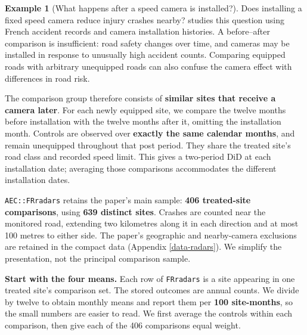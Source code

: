 \documentclass[
  11pt,
]{book}
\theoremstyle{definition}
\theoremstyle{definition}
\newtheorem{example}{Example}[chapter]
\theoremstyle{definition}
\theoremstyle{definition}
\theoremstyle{remark}
\begin{document}
\begin{example}[What happens after a speed camera is installed?]
\protect\hypertarget{exm:panel-did-radars}{}\label{exm:panel-did-radars}Does installing a fixed speed camera reduce injury crashes nearby? \citet{Renne_2026_cameras} studies this question using French accident records and camera installation histories. A before--after comparison is insufficient: road safety changes over time, and cameras may be installed in response to unusually high accident counts. Comparing equipped roads with arbitrary unequipped roads can also confuse the camera effect with differences in road risk.

The comparison group therefore consists of \textbf{similar sites that receive a camera later}. For each newly equipped site, we compare the twelve months before installation with the twelve months after it, omitting the installation month. Controls are observed over \textbf{exactly the same calendar months}, and remain unequipped throughout that post period. They share the treated site's road class and recorded speed limit. This gives a two-period DiD at each installation date; averaging those comparisons accommodates the different installation dates.

\texttt{AEC::FRradars} retains the paper's main sample: \textbf{406 treated-site comparisons}, using \textbf{639 distinct sites}. Crashes are counted near the monitored road, extending two kilometres along it in each direction and at most 100 metres to either side. The paper's geographic and nearby-camera exclusions are retained in the compact data (Appendix \ref{data-radars}). We simplify the presentation, not the principal comparison sample.

\textbf{Start with the four means.} Each row of \texttt{FRradars} is a site appearing in one treated site's comparison set. The stored outcomes are annual counts. We divide by twelve to obtain monthly means and report them per \textbf{100 site-months}, so the small numbers are easier to read. We first average the controls within each comparison, then give each of the 406 comparisons equal weight.

\begin{table}[H]
\centering\begingroup\fontsize{10}{12}\selectfont

\endgroup{}
\end{table}


\end{example}
\end{document}
